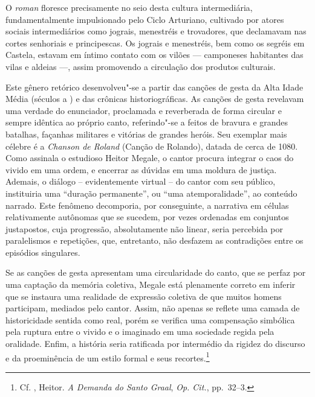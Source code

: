 O \textit{roman }floresce precisamente no seio desta cultura intermediária,
fundamentalmente impulsionado pelo Ciclo Arturiano, cultivado por atores
sociais intermediários como jograis, menestréis e trovadores, que declamavam
nas cortes senhoriais e principescas. Os jograis e menestréis, bem como os segréis em Castela,
estavam em íntimo contato com os vilões --- camponeses habitantes das vilas e aldeias ---,
assim promovendo a circulação dos produtos culturais.

Este gênero retórico desenvolveu"-se a
partir das canções de gesta da Alta Idade Média (séculos  a ) e das
crônicas historiográficas. As canções de gesta revelavam uma verdade do
enunciador, proclamada e reverberada de forma circular e sempre idêntica ao
próprio canto, referindo"-se a feitos de bravura e grandes batalhas, façanhas
militares e vitórias de grandes heróis. Seu exemplar mais célebre é a
\textit{Chanson de Roland} (Canção de Rolando), datada de cerca de  1080.
Como assinala o estudioso Heitor Megale, o cantor procura integrar o caos do
vivido em uma ordem, e encerrar as dúvidas em uma moldura de justiça. Ademais,
o diálogo -- evidentemente virtual -- do cantor com seu público, instituiria uma
“duração permanente”, ou “uma atemporalidade”, ao conteúdo narrado. Este
fenômeno decomporia, por conseguinte, a narrativa em células relativamente
autônomas que se sucedem, por vezes ordenadas em conjuntos justapostos, cuja
progressão, absolutamente não linear, seria percebida por paralelismos e
repetições, que, entretanto, não desfazem as contradições entre os episódios
singulares.

Se as canções de gesta apresentam uma circularidade do canto, que se perfaz por
uma captação da memória coletiva, Megale está plenamente correto em inferir que
se instaura uma realidade de expressão coletiva de que muitos homens
participam, mediados pelo cantor. Assim, não apenas se reflete uma camada de
historicidade sentida como real, porém se verifica uma compensação simbólica
pela ruptura entre o vivido e o imaginado em uma sociedade regida pela
oralidade. Enfim, a história seria ratificada por intermédio da rigidez do discurso e da proeminência de um estilo
formal e seus recortes.\footnote{ Cf. , Heitor. \textit{A Demanda do Santo Graal}, \textit{Op. Cit.}, pp.~32--3. }

